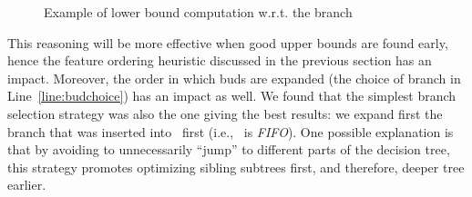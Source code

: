 \documentclass{llncs}
\begin{document}
\begin{example}
\begin{figure}
\begin{center}
	\end{center}
	\caption{\label{fig:lowerbound} Example of lower bound computation w.r.t. the branch }
	\end{figure}

\end{example}


\medskip

This reasoning will be more effective when good upper bounds are found early, hence the feature ordering heuristic discussed in the previous section has an impact. Moreover, the order in which buds are expanded (the choice of branch in Line~\ref{line:budchoice}) has an impact as well. We found that the simplest branch selection strategy was also the one giving the best results: we expand first the branch that was inserted into \bud\ first (i.e., \bud\ is \emph{FIFO}). One possible explanation is that by avoiding to unnecessarily ``jump'' to different parts of the decision tree, this strategy promotes optimizing sibling subtrees first, and therefore, deeper tree earlier.




\end{document}
